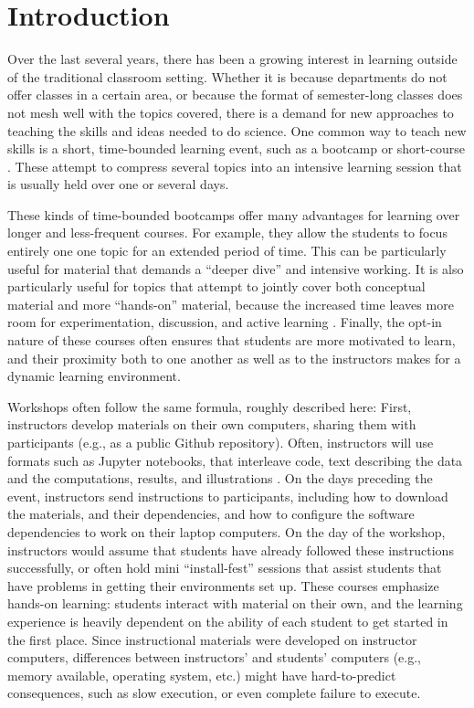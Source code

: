\section{Introduction}

Over the last several years, there has been a growing interest in learning
outside of the traditional classroom setting. Whether it is because departments
do not offer classes in a certain area, or because the format of semester-long
classes does not mesh well with the topics covered, there is a demand for new
approaches to teaching the skills and ideas needed to do science. One common way
to teach new skills is a short, time-bounded learning event, such as a bootcamp
or short-course \cite{wilson2016software}. These attempt to compress several
topics into an intensive learning session that is usually held over one or
several days.

These kinds of time-bounded bootcamps offer many advantages for learning over
longer and less-frequent courses. For example, they allow the students to focus
entirely one one topic for an extended period of time. This can be particularly
useful for material that demands a ``deeper dive'' and intensive working. It is
also particularly useful for topics that attempt to jointly cover both
conceptual material and more ``hands-on'' material, because the increased time
leaves more room for experimentation, discussion, and active learning
\citep{Bransford2000-lu, Papert1980-fh}. Finally, the opt-in nature of these
courses often ensures that students are more motivated to learn, and their
proximity both to one another as well as to the instructors makes for a dynamic
learning environment.

Workshops often follow the same formula, roughly described here: First,
instructors develop materials on their own computers, sharing them with
participants (e.g., as a public Github repository). Often, instructors will use
formats such as Jupyter notebooks, that interleave code, text describing the
data and the computations, results, and illustrations
\cite{kluyver2016jupyter}. On the days preceding the event, instructors send
instructions to participants, including how to download the materials, and their
dependencies, and how to configure the software dependencies to work on their
laptop computers. On the day of the workshop, instructors would assume that
students have already followed these instructions successfully, or often hold
mini ``install-fest'' sessions that assist students that have problems in
getting their environments set up. These courses emphasize hands-on learning:
students interact with material on their own, and the learning experience is
heavily dependent on the ability of each student to get started in the first
place. Since instructional materials were developed on instructor computers,
differences between instructors' and students' computers (e.g., memory
available, operating system, etc.) might have hard-to-predict consequences, such
as slow execution, or even complete failure to execute.


